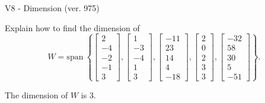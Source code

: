 \begin{exercise}
  \begin{exerciseTitle}V8 - Dimension (ver. 975)\end{exerciseTitle}
  \begin{exerciseStatement}
    Explain how to find the dimension of 
\[W=\mathrm{span}\ \left\{\left[\begin{array}{r}
2 \\
-4 \\
-2 \\
-1 \\
3
\end{array}\right] , \left[\begin{array}{r}
1 \\
-3 \\
-4 \\
1 \\
3
\end{array}\right] , \left[\begin{array}{r}
-11 \\
23 \\
14 \\
4 \\
-18
\end{array}\right] , \left[\begin{array}{r}
2 \\
0 \\
2 \\
3 \\
3
\end{array}\right] , \left[\begin{array}{r}
-32 \\
58 \\
30 \\
5 \\
-51
\end{array}\right]\right\}.\]



  \end{exerciseStatement}
  \begin{exerciseAnswer}
   The dimension of \(W\) is  \(3\).
  


  \end{exerciseAnswer}
\end{exercise}